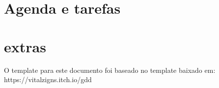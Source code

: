 \documentclass[12pt,a4paper]{article}
\begin{document}


\section{Agenda e tarefas}



\section{extras}

O template para este documento foi baseado no template baixado em: https://vitalzigns.itch.io/gdd
\end{document}
